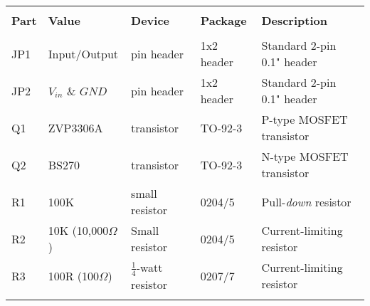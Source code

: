 \begin{tabular}{lllll}
\hline\\[\negsep]
\textbf{Part} & \textbf{Value} & \textbf{Device} & \textbf{Package} & \textbf{Description} \\[\sep]
\hline\\[\negsep]
JP1  &  Input/Output & pin header    & 1x2 header     & Standard 2-pin 0.1" header \\[\sep]
JP2  &  $V_{in}$ \& $GND$ & pin header & 1x2 header     & Standard 2-pin 0.1" header \\[\sep]
Q1   &  ZVP3306A    & transistor        & TO-92-3     & P-type MOSFET transistor \\[\sep]
Q2   &  BS270       & transistor         & TO-92-3     & N-type MOSFET transistor \\[\sep]
R1   &  100K        & small resistor & 0204/5    & Pull-\emph{down} resistor \\[\sep]
R2   &  10K (10,000$\Omega$)         & Small resistor & 0204/5    & Current-limiting resistor \\[\sep]
R3   &  100R (100$\Omega$) & $\frac{1}{4}$-watt resistor & 0207/7 & Current-limiting resistor \\[\sep]

\hline\\
\end{tabular}
